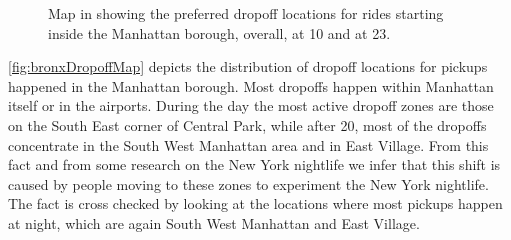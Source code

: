 \documentclass{acm_proc_article-sp-sigmod09}
\begin{document}
\begin{figure}
	\caption{Map in showing the preferred dropoff locations for rides starting inside the Manhattan borough, overall, at 10 and at 23.}
	
\end{figure}

\cref{fig:bronxDropoffMap} depicts the distribution of dropoff locations for pickups happened in the Manhattan borough. Most dropoffs happen within Manhattan itself or in the airports. During the day the most active dropoff zones are those on the South East corner of Central Park, while after 20, most of the dropoffs concentrate in the South West Manhattan area and in East Village. From this fact and from some research on the New York nightlife we infer that this shift is caused by people moving to these zones to experiment the New York nightlife. The fact is cross checked by looking at the locations where most pickups happen at night, which are again South West Manhattan and East Village.
\end{document}
